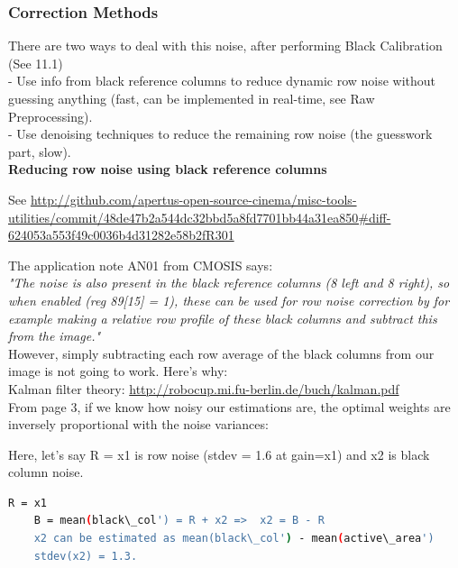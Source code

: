 {\subsubsection{Correction Methods}

There are two ways to deal with this noise, after performing Black Calibration (See 11.1)\\

- Use info from black reference columns to reduce dynamic row noise without guessing anything (fast, can be implemented in real-time, see Raw Preprocessing).\\
- Use denoising techniques to reduce the remaining row noise (the guesswork part, slow).\\

\textbf{Reducing row noise using black reference columns}

See \href{http://github.com/apertus-open-source-cinema/misc-tools-utilities/commit/48de47b2a544dc32bbd5a8fd7701bb44a31ea850#diff-624053a553f49c0036b4d31282e58b2fR301}{http://github.com/apertus-open-source-cinema/misc-tools-utilities/commit/48de47b2a544dc32bbd5a8fd7701bb44a31ea850#diff-624053a553f49c0036b4d31282e58b2fR301}

The application note AN01 from CMOSIS says:\\

\textit{"The noise is also present in the black reference columns (8 left and 8 right), so when enabled (reg 89[15] = 1), these can be used for row noise correction by for example making a relative row profile of these black columns and subtract this from the image."}\\

However, simply subtracting each row average of the black columns from our image is not going to work. Here's why:\\

Kalman filter theory: \href{http://robocup.mi.fu-berlin.de/buch/kalman.pdf}{http://robocup.mi.fu-berlin.de/buch/kalman.pdf} \\

From page 3, if we know how noisy our estimations are, the optimal weights are inversely proportional with the noise variances:\\


Here, let's say R = x1 is row noise (stdev = 1.6 at gain=x1) and x2 is black column noise. 

\begin{lstlisting}[language=bash,morekeywords=$,keywordstyle=\bfseries,frame=none,xleftmargin=.25in,belowskip=2em, aboveskip=2em]
    R = x1
    B = mean(black\_col') = R + x2 =>  x2 = B - R
    x2 can be estimated as mean(black\_col') - mean(active\_area')
    stdev(x2) = 1.3.
\end{lstlisting}

}
